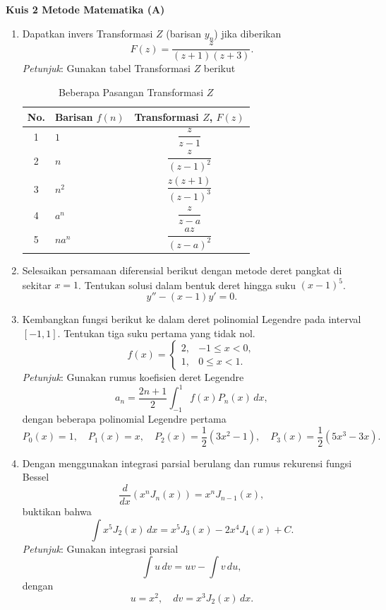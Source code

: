\documentclass[12pt,openany,a4paper]{article}
\begin{document}

\noindent\textbf{\Large Kuis 2 Metode Matematika (A)}
\vspace{0.5cm}

\begin{enumerate}
  \item Dapatkan invers Transformasi $Z$ (barisan $y_n$) jika diberikan
        \[F(z) = \frac{z}{(z+1)(z+3)}.\]
        \textit{Petunjuk}: Gunakan tabel Transformasi $Z$ berikut

        \begin{table}[h]
          \centering
          \renewcommand{\arraystretch}{1.5}
          \caption{Beberapa Pasangan Transformasi $Z$}
          \begin{tabular}{clc}
            \hline
            No. & Barisan $f(n)$ & Transformasi $Z$, $F(z)$  \\
            \hline
            1   & $1$            & $\dfrac{z}{z-1}$          \\[1ex]
            2   & $n$            & $\dfrac{z}{(z-1)^2}$      \\[1ex]
            3   & $n^2$          & $\dfrac{z(z+1)}{(z-1)^3}$ \\[1ex]
            4   & $a^n$          & $\dfrac{z}{z-a}$          \\[1ex]
            5   & $n a^n$        & $\dfrac{az}{(z-a)^2}$     \\[1ex]
            \hline
          \end{tabular}
        \end{table}

  \item Selesaikan persamaan diferensial berikut dengan metode deret pangkat di sekitar $x = 1$. Tentukan solusi dalam bentuk deret hingga suku $(x - 1)^5$.
        \[y'' - (x - 1)y' = 0.\]

  \item Kembangkan fungsi berikut ke dalam deret polinomial Legendre pada interval $[-1, 1]$. Tentukan tiga suku pertama yang tidak nol.
        \[f(x) = \begin{cases} 2, & -1 \le x < 0, \\ 1, & 0 \le x < 1. \end{cases}\]
        \textit{Petunjuk}: Gunakan rumus koefisien deret Legendre
        \[a_n = \frac{2n + 1}{2} \int_{-1}^{1} f(x)P_n(x) \, dx,\]
        dengan beberapa polinomial Legendre pertama
        \[P_0(x) = 1, \quad P_1(x) = x, \quad P_2(x) = \frac{1}{2}(3x^2 - 1), \quad P_3(x) = \frac{1}{2}(5x^3 - 3x).\]

  \item Dengan menggunakan integrasi parsial berulang dan rumus rekurensi fungsi Bessel
        \[\frac{d}{dx} (x^n J_n(x)) = x^n J_{n-1}(x),\]
        buktikan bahwa
        \[\int x^5 J_2(x) \, dx = x^5 J_3(x) - 2x^4 J_4(x) + C.\]
        \textit{Petunjuk}: Gunakan integrasi parsial
        \[\int u \, dv = uv - \int v \, du,\]
        dengan
        \[u = x^2, \quad dv = x^3 J_2(x) \, dx.\]
\end{enumerate}
\end{document}
